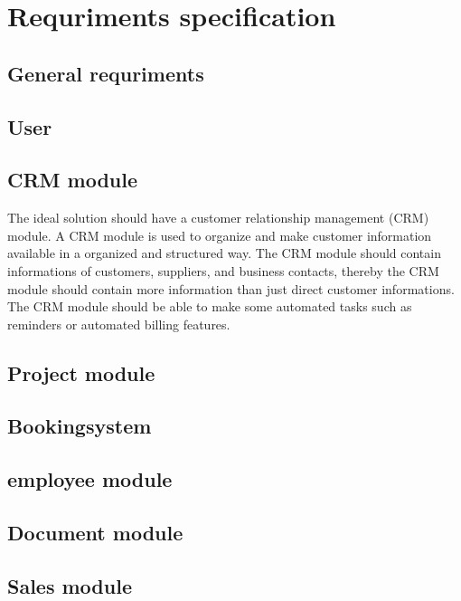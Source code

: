 \section{Requriments specification}



\subsection{General requriments}

\subsection{User}

\subsection{CRM module}

The ideal solution should have a customer relationship management (CRM) module. A CRM module is used to organize and make customer information available in a organized and structured way. The CRM module should contain informations of customers, suppliers, and business contacts, thereby the CRM module should contain more information than just direct customer informations.\\

The CRM module should be able to make some automated tasks such as reminders or automated billing features. 

\subsection{Project module}

\subsection{Bookingsystem}

\subsection{employee module}

\subsection{Document module}

\subsection{Sales module}



